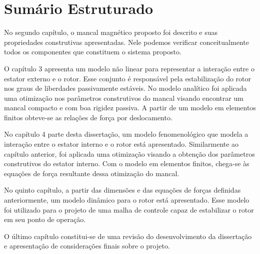 \section{Sumário Estruturado}
 
No segundo capítulo, o mancal magnético proposto foi descrito e suas propriedades construtivas apresentadas. Nele podemos verificar conceitualmente todos os componentes que constituem o sistema proposto.

O capítulo 3 apresenta um modelo não linear para representar a interação entre o estator externo e o rotor. Esse conjunto é responsável pela estabilização do rotor nos graus de liberdades passivamente estáveis. No modelo analítico foi aplicada uma otimização nos parâmetros construtivos do mancal visando encontrar um mancal compacto e com boa rigidez passiva. A partir de um modelo em elementos finitos obteve-se as relações de força por deslocamento.

No capítulo 4 parte desta dissertação, um modelo fenomenológico que modela a interação entre o estator interno e o rotor está apresentado. Similarmente ao capítulo anterior, foi aplicada uma otimização visando a obtenção dos parâmetros construtivos do estator interno. Com o modelo em elementos finitos, chega-se às equações de força resultante dessa otimização do mancal.  

No quinto capítulo, a partir das dimensões e das equações de forças definidas anteriormente, um modelo dinâmico para o rotor está apresentado. Esse modelo foi utilizado para o projeto de uma malha de controle capaz de estabilizar o rotor em seu ponto de operação.

O último capítulo constitui-se de uma revisão do desenvolvimento da dissertação e apresentação de considerações finais sobre o projeto.


